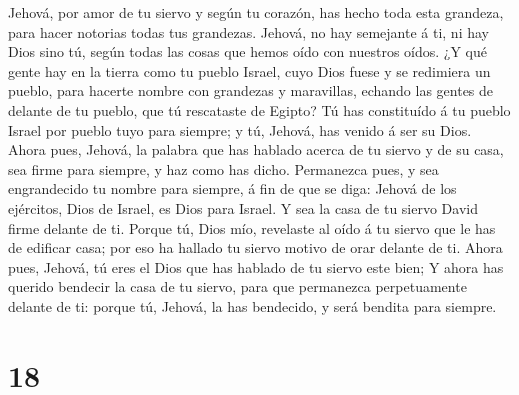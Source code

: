 Jehová, por amor de tu siervo y según tu corazón, has hecho toda esta
grandeza, para hacer notorias todas tus grandezas. 
Jehová, no hay semejante á ti, ni hay Dios sino tú, según todas las
cosas que hemos oído con nuestros oídos.  ¿Y qué gente
hay en la tierra como tu pueblo Israel, cuyo Dios fuese y se redimiera
un pueblo, para hacerte nombre con grandezas y maravillas, echando las
gentes de delante de tu pueblo, que tú rescataste de Egipto?
 Tú has constituído á tu pueblo Israel por pueblo tuyo
para siempre; y tú, Jehová, has venido á ser su Dios. 
Ahora pues, Jehová, la palabra que has hablado acerca de tu siervo y de
su casa, sea firme para siempre, y haz como has dicho. 
Permanezca pues, y sea engrandecido tu nombre para siempre, á fin de que
se diga: Jehová de los ejércitos, Dios de Israel, es Dios para Israel. Y
sea la casa de tu siervo David firme delante de ti. 
Porque tú, Dios mío, revelaste al oído á tu siervo que le has de
edificar casa; por eso ha hallado tu siervo motivo de orar delante de
ti.  Ahora pues, Jehová, tú eres el Dios que has hablado
de tu siervo este bien;  Y ahora has querido bendecir la
casa de tu siervo, para que permanezca perpetuamente delante de ti:
porque tú, Jehová, la has bendecido, y será bendita para siempre.

\hypertarget{section-17}{%
\section{18}\label{section-17}}

